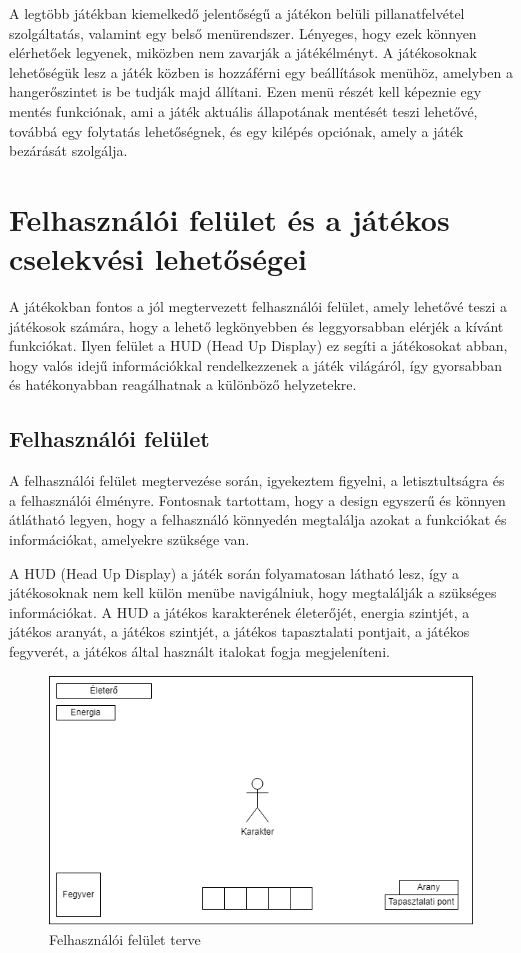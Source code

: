 A legtöbb játékban kiemelkedő jelentőségű a játékon belüli pillanatfelvétel szolgáltatás, valamint egy belső menürendszer. Lényeges, hogy ezek könnyen elérhetőek legyenek, miközben nem zavarják a játékélményt. A játékosoknak lehetőségük lesz a játék közben is hozzáférni egy beállítások menühöz, amelyben a hangerőszintet is be tudják majd állítani. Ezen menü részét kell képeznie egy mentés funkciónak, ami a játék aktuális állapotának mentését teszi lehetővé, továbbá egy folytatás lehetőségnek, és egy kilépés opciónak, amely a játék bezárását szolgálja.


\section{Felhasználói felület és a játékos cselekvési lehetőségei}

A játékokban fontos a jól megtervezett felhasználói felület, amely lehetővé teszi a játékosok számára, hogy a lehető legkönyebben és leggyorsabban elérjék a kívánt funkciókat. Ilyen felület a HUD (Head Up Display)  ez segíti a játékosokat abban, hogy valós idejű információkkal rendelkezzenek a játék világáról, így gyorsabban és hatékonyabban reagálhatnak a különböző helyzetekre.


\subsection{Felhasználói felület}

A felhasználói felület megtervezése során, igyekeztem figyelni, a letisztultságra és a felhasználói élményre. Fontosnak tartottam, hogy a design egyszerű és könnyen átlátható legyen, hogy a felhasználó könnyedén megtalálja azokat a funkciókat és információkat, amelyekre szüksége van.

A HUD (Head Up Display) a játék során folyamatosan látható lesz, így a játékosoknak nem kell külön menübe navigálniuk, hogy megtalálják a szükséges információkat. A HUD a játékos karakterének életerőjét, energia szintjét, a játékos aranyát, a játékos szintjét, a játékos tapasztalati pontjait, a játékos fegyverét, a játékos által használt italokat fogja megjeleníteni.

\begin{figure}[H]
    \centering
    \includegraphics[width=14.0truecm]{images/MS_UI.drawio.png}
    \caption{Felhasználói felület terve}
    \label{fig:Felhasználói felület}
\end{figure}

